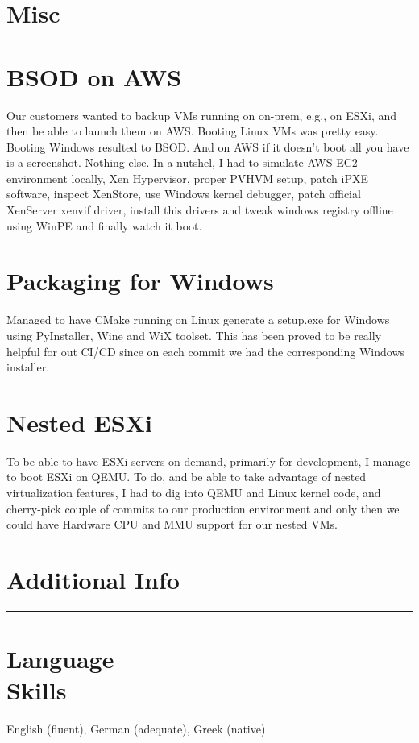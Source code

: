 \documentclass[margin,centered]{res}
\begin{document}
\begin{resume}
\section{Misc}

\section{\sc BSOD on AWS}
Our customers wanted to backup VMs running on on-prem, e.g., on ESXi, and then
be able to launch them on AWS. Booting Linux VMs was pretty easy. Booting
Windows resulted to BSOD. And on AWS if it doesn't boot all you have is a
screenshot. Nothing else. In a nutshel, I had to simulate AWS EC2 environment
locally, Xen Hypervisor, proper PVHVM setup, patch iPXE software, inspect
XenStore, use Windows kernel debugger, patch official XenServer xenvif driver,
install this drivers and tweak windows registry offline using WinPE and
finally watch it boot.

\section{\sc Packaging for Windows}
Managed to have CMake running on Linux generate a setup.exe for Windows using
PyInstaller, Wine and WiX toolset. This has been proved to be really helpful for
out CI/CD since on each commit we had the corresponding Windows installer.

\section{\sc Nested ESXi}
To be able to have ESXi servers on demand, primarily for development, I manage
to boot ESXi on QEMU. To do, and be able to take advantage of nested
virtualization features, I had to dig into QEMU and Linux kernel code, and
cherry-pick couple of commits to our production environment and only then we
could have Hardware CPU and MMU support for our nested VMs.


\section{Additional Info}
\rule[3pt]{\textwidth}{0.4pt}

\section{\sc Language\\Skills}
English (fluent), German (adequate), Greek (native)


\end{resume}
\end{document}
